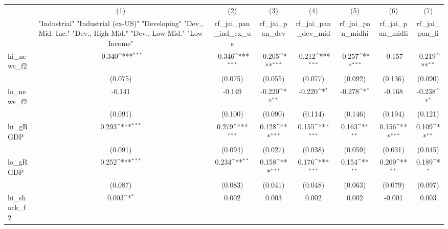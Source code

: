 {
\def\sym#1{\ifmmode^{#1}\else\(^{#1}\)\fi}
\begin{tabular}{l*{7}{c}}
\toprule
            &\multicolumn{1}{c}{(1)}&\multicolumn{1}{c}{(2)}&\multicolumn{1}{c}{(3)}&\multicolumn{1}{c}{(4)}&\multicolumn{1}{c}{(5)}&\multicolumn{1}{c}{(6)}&\multicolumn{1}{c}{(7)}\\
            &\multicolumn{1}{c}{ "Industrial" "Industrial (ex-US)" "Developing" "Dev., Mid.-Inc." "Dev., High-Mid."  "Dev., Low-Mid." "Low Income" }&\multicolumn{1}{c}{rf\_jai\_pan\_ind\_ex\_us}&\multicolumn{1}{c}{rf\_jai\_pan\_dev}&\multicolumn{1}{c}{rf\_jai\_pan\_dev\_mid}&\multicolumn{1}{c}{rf\_jai\_pan\_midhi}&\multicolumn{1}{c}{rf\_jai\_pan\_midli}&\multicolumn{1}{c}{rf\_jai\_pan\_li}\\
\midrule
hi\_news\_f2  &      -0.340\sym{***}&      -0.346\sym{***}&      -0.205\sym{***}&      -0.212\sym{***}&      -0.257\sym{***}&      -0.157         &      -0.219\sym{**} \\
            &     (0.075)         &     (0.075)         &     (0.055)         &     (0.077)         &     (0.092)         &     (0.136)         &     (0.090)         \\
\addlinespace
lo\_news\_f2  &      -0.141         &      -0.149         &      -0.220\sym{**} &      -0.220\sym{*}  &      -0.278\sym{*}  &      -0.168         &      -0.238\sym{*}  \\
            &     (0.091)         &     (0.100)         &     (0.090)         &     (0.114)         &     (0.146)         &     (0.194)         &     (0.121)         \\
\addlinespace
hi\_gRGDP    &       0.293\sym{***}&       0.279\sym{***}&       0.128\sym{***}&       0.155\sym{***}&       0.163\sym{**} &       0.156\sym{***}&       0.109\sym{**} \\
            &     (0.091)         &     (0.094)         &     (0.027)         &     (0.038)         &     (0.059)         &     (0.031)         &     (0.045)         \\
\addlinespace
lo\_gRGDP    &       0.252\sym{***}&       0.234\sym{**} &       0.158\sym{***}&       0.176\sym{***}&       0.154\sym{**} &       0.209\sym{**} &       0.189\sym{*}  \\
            &     (0.087)         &     (0.083)         &     (0.041)         &     (0.048)         &     (0.063)         &     (0.079)         &     (0.097)         \\
\addlinespace
hi\_shock\_f2 &       0.003\sym{*}  &       0.002         &       0.003         &       0.002         &       0.002         &      -0.001         &       0.003         \\

\end{tabular}}
